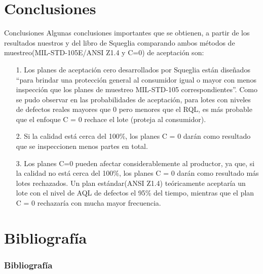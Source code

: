 \documentclass[10pt]{beamer}
\begin{document}
\section{Conclusiones}
\begin{frame}{Conclusiones}
Algunas conclusiones importantes que se obtienen, a partir de los resultados nuestros y del libro de Squeglia comparando ambos métodos de muestreo(MIL-STD-105E/ANSI Z1.4 y C=0) de aceptación son:
\begin{itemize}
\item[1.]Los planes de aceptación cero desarrollados por Squeglia están diseñados ``para brindar una protección general al consumidor igual o mayor con menos inspección que los planes de muestreo MIL-STD-105 correspondientes''. Como se pudo observar en las probabilidades de aceptación, para lotes con niveles de defectos reales mayores que 0 pero menores que el RQL, es más probable que el enfoque C = 0 rechace el lote (proteja al consumidor).

\item[2.]Si la calidad está cerca del 100\%, los planes C = 0 darán como resultado que se inspeccionen menos partes en total.

\item[3.]Los planes C=0 pueden afectar considerablemente al productor, ya que, si la calidad no está cerca del 100\%, los planes C = 0 darán como resultado más lotes rechazados. Un plan estándar(ANSI Z1.4) teóricamente aceptaría un lote con el nivel de AQL de defectos el 95\% del tiempo, mientras que el plan C = 0 rechazaría con mucha mayor frecuencia.
\end{itemize}
\end{frame}


\section{Bibliografía}
\begin{frame}
  \frametitle{Bibliografía}
  
\nocite{A0,ControlR}
  
  
  
\end{frame}
\end{document}
